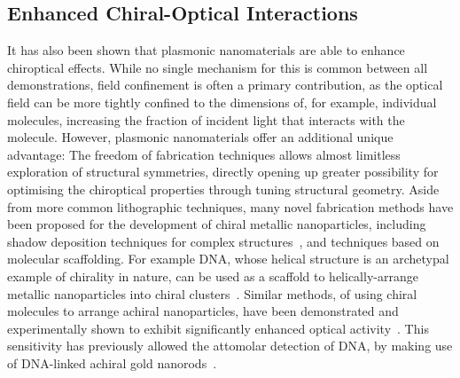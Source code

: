 \subsection{Enhanced Chiral-Optical Interactions} \label{sec:background:Plasmonics:chiralPlasmonics}
It has also been shown that plasmonic nanomaterials are able to enhance chiroptical effects. While no single mechanism for this is common between all demonstrations, field confinement is often a primary contribution, as the optical field can be more tightly confined to the dimensions of, for example, individual molecules, increasing the fraction of incident light that interacts with the molecule. However, plasmonic nanomaterials offer an additional unique advantage: The freedom of fabrication techniques allows almost limitless exploration of structural symmetries, directly opening up greater possibility for optimising the chiroptical properties through tuning structural geometry. Aside from more common lithographic techniques, many novel fabrication methods have been proposed for the development of chiral metallic nanoparticles, including shadow deposition techniques for complex structures~\cite{Mark2013}, and techniques based on molecular scaffolding. For example DNA, whose helical structure is an archetypal example of chirality in nature, can be used as a scaffold to helically-arrange metallic nanoparticles into chiral clusters~\cite{Shen2012}. Similar methods, of using chiral molecules to arrange achiral nanoparticles, have been demonstrated and experimentally shown to exhibit significantly enhanced optical activity~\cite{Knoppe2012a, Knoppe2012, Farrag2016}. This sensitivity has previously allowed the attomolar detection of DNA, by making use of DNA-linked achiral gold nanorods~\cite{Ma2013b}.

